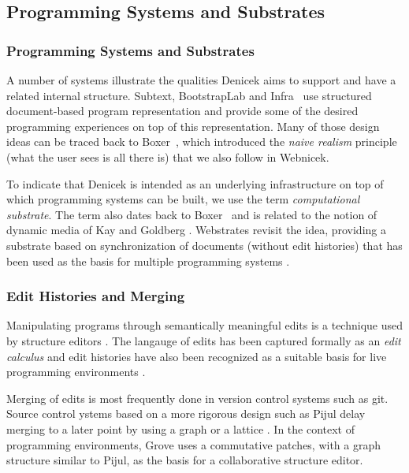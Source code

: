 \documentclass[sigconf,anonymous,screen]{acmart}
\begin{document}

\subsection{Programming Systems and Substrates}
\label{sec:background-sys}

\subsubsection*{Programming Systems and Substrates}
A number of systems illustrate the qualities Denicek aims to support and have a related internal
structure. Subtext, BootstrapLab and Infra~\cite{edwards-2005-subtext,jakubovic-2022-ladder,hall-2017-infra}
use structured document-based program representation and provide some of the desired programming
experiences on top of this representation. Many of those design ideas can be traced back to
Boxer~\cite{disessa-1986-boxer}, which introduced the \emph{naive realism} principle (what the user
sees is all there is) that we also follow in Webnicek.

To indicate that Denicek is intended as an underlying infrastructure on top of which programming
systems can be built, we use the term \emph{computational substrate}. The term also dates back to
Boxer~\cite{disessa-1995-epistemology} and is related to the notion of dynamic media of Kay and
Goldberg \cite{kay-1977-media}. Webstrates \cite{klokmose-2015-webstrates}
revisit the idea, providing a substrate based on synchronization of documents (without edit
histories) that has been used as the basis for multiple programming systems \cite{radle-2017-codestrates,borowski-2022-varv}.

\subsubsection*{Edit Histories and Merging}
Manipulating programs through semantically meaningful edits is a technique used by structure
editors \cite{teitelbaum-1981-cps,hempel-2018-deuce,beckman-2023-sandblocks}. The langauge of
edits has been captured formally as an \emph{edit calculus} \cite{omar-2017-hazelnut} and
edit histories have also been recognized as a suitable basis for live programming environments \cite{storm-2013-deltas}.

Merging of edits is most frequently done in version control systems such as git. Source control ystems
based on a more rigorous design such as Pijul \cite{meunier-2024-pijul} delay merging to a later point
by using a graph or a lattice \cite{schurmann-2022-merging}. In the context of
programming environments, Grove \cite{adams-2025-grove} uses a commutative patches, with a graph
structure similar to Pijul, as the basis for a collaborative structure editor.
\end{document}

